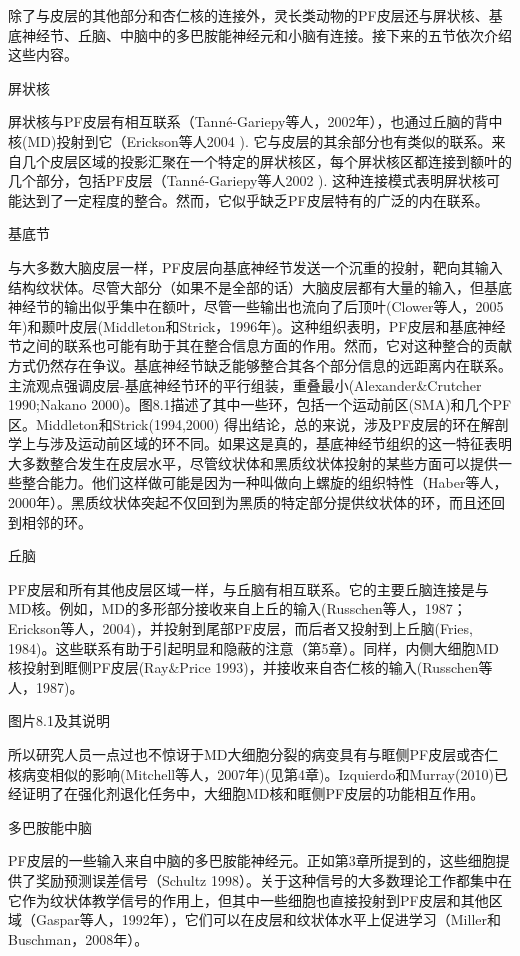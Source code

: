 除了与皮层的其他部分和杏仁核的连接外，灵长类动物的PF皮层还与屏状核、基底神经节、丘脑、中脑中的多巴胺能神经元和小脑有连接。接下来的五节依次介绍这些内容。

屏状核

屏状核与PF皮层有相互联系（Tanné-Gariepy等人，2002年），也通过丘脑的背中核(MD)投射到它（Erickson等人2004 ). 它与皮层的其余部分也有类似的联系。来自几个皮层区域的投影汇聚在一个特定的屏状核区，每个屏状核区都连接到额叶的几个部分，包括PF皮层（Tanné-Gariepy等人2002 ). 这种连接模式表明屏状核可能达到了一定程度的整合。然而，它似乎缺乏PF皮层特有的广泛的内在联系。

基底节

与大多数大脑皮层一样，PF皮层向基底神经节发送一个沉重的投射，靶向其输入结构纹状体。尽管大部分（如果不是全部的话）大脑皮层都有大量的输入，但基底神经节的输出似乎集中在额叶，尽管一些输出也流向了后顶叶(Clower等人，2005年)和颞叶皮层(Middleton和Strick，1996年)。这种组织表明，PF皮层和基底神经节之间的联系也可能有助于其在整合信息方面的作用。然而，它对这种整合的贡献方式仍然存在争议。基底神经节缺乏能够整合其各个部分信息的远距离内在联系。主流观点强调皮层-基底神经节环的平行组装，重叠最小(Alexander$\&$Crutcher 1990;Nakano 2000)。图8.1描述了其中一些环，包括一个运动前区(SMA)和几个PF区。Middleton和Strick(1994,2000) 得出结论，总的来说，涉及PF皮层的环在解剖学上与涉及运动前区域的环不同。如果这是真的，基底神经节组织的这一特征表明大多数整合发生在皮层水平，尽管纹状体和黑质纹状体投射的某些方面可以提供一些整合能力。他们这样做可能是因为一种叫做向上螺旋的组织特性（Haber等人，2000年）。黑质纹状体突起不仅回到为黑质的特定部分提供纹状体的环，而且还回到相邻的环。

丘脑

PF皮层和所有其他皮层区域一样，与丘脑有相互联系。它的主要丘脑连接是与MD核。例如，MD的多形部分接收来自上丘的输入(Russchen等人，1987；Erickson等人，2004)，并投射到尾部PF皮层，而后者又投射到上丘脑(Fries, 1984)。这些联系有助于引起明显和隐蔽的注意（第5章）。同样，内侧大细胞MD核投射到眶侧PF皮层(Ray$\&$Price 1993)，并接收来自杏仁核的输入(Russchen等人，1987)。

图片8.1及其说明

所以研究人员一点过也不惊讶于MD大细胞分裂的病变具有与眶侧PF皮层或杏仁核病变相似的影响(Mitchell等人，2007年)(见第4章)。Izquierdo和Murray(2010)已经证明了在强化剂退化任务中，大细胞MD核和眶侧PF皮层的功能相互作用。

多巴胺能中脑

PF皮层的一些输入来自中脑的多巴胺能神经元。正如第3章所提到的，这些细胞提供了奖励预测误差信号（Schultz 1998）。关于这种信号的大多数理论工作都集中在它作为纹状体教学信号的作用上，但其中一些细胞也直接投射到PF皮层和其他区域（Gaspar等人，1992年），它们可以在皮层和纹状体水平上促进学习（Miller和Buschman，2008年）。

